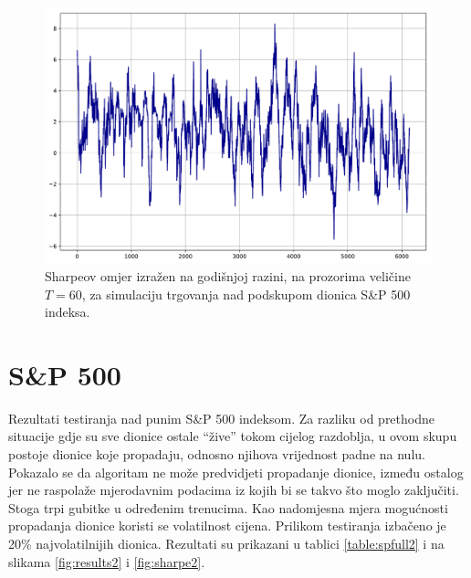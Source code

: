 \documentclass[lmodern, utf8, diplomski, numeric]{fer}
\begin{document}
  \begin{figure}[p]
    \centering
    \includegraphics[width=\linewidth]{graphics/sharpe1.pdf}
    \caption{Sharpeov omjer izražen na godišnjoj razini, na prozorima veličine $T = 60$, za simulaciju trgovanja nad podskupom dionica S\&P 500 indeksa.}
    \label{fig:sharpe1}
  \end{figure}

  
  \pagebreak
  
  \section{S\&P 500}
  Rezultati testiranja nad punim S\&P 500 indeksom.
  Za razliku od prethodne situacije gdje su sve dionice ostale ``žive'' tokom cijelog razdoblja, u ovom skupu postoje dionice koje propadaju, odnosno njihova vrijednost padne na nulu.
  Pokazalo se da algoritam ne može predvidjeti propadanje dionice, između ostalog jer ne raspolaže mjerodavnim podacima iz kojih bi se takvo što moglo zaključiti.
  Stoga trpi gubitke u određenim trenucima.
  Kao nadomjesna mjera mogućnosti propadanja dionice koristi se volatilnost cijena.
  Prilikom testiranja izbačeno je 20\% najvolatilnijih dionica.
  Rezultati su prikazani u tablici \ref{table:spfull2} i na slikama \ref{fig:results2} i \ref{fig:sharpe2}.
  
\end{document}
